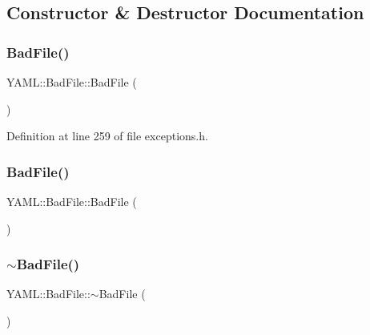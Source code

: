 \subsection{Constructor \& Destructor Documentation}
\mbox{\label{class_y_a_m_l_1_1_bad_file_a3a1c7d671955a43693e4ed9b4f9966de}} 
\subsubsection{\texorpdfstring{BadFile()}{BadFile()}\hspace{0.1cm}{\footnotesize\ttfamily [1/2]}}
{\footnotesize\ttfamily Y\+A\+M\+L\+::\+Bad\+File\+::\+Bad\+File (\begin{DoxyParamCaption}{ }\end{DoxyParamCaption})\hspace{0.3cm}{\ttfamily [inline]}}



Definition at line 259 of file exceptions.\+h.

\mbox{\label{class_y_a_m_l_1_1_bad_file_a7fa6e06c3fe955f7bff500d9cf553f6d}} 
\subsubsection{\texorpdfstring{BadFile()}{BadFile()}\hspace{0.1cm}{\footnotesize\ttfamily [2/2]}}
{\footnotesize\ttfamily Y\+A\+M\+L\+::\+Bad\+File\+::\+Bad\+File (\begin{DoxyParamCaption}\item[{const \mbox{\hyperlink{class_y_a_m_l_1_1_bad_file}{Bad\+File}} \&}]{ }\end{DoxyParamCaption})\hspace{0.3cm}{\ttfamily [default]}}

\mbox{\label{class_y_a_m_l_1_1_bad_file_a954c85cdaba3c4c111abdf0b74a47fff}} 
\subsubsection{\texorpdfstring{$\sim$BadFile()}{~BadFile()}}
{\footnotesize\ttfamily Y\+A\+M\+L\+::\+Bad\+File\+::$\sim$\+Bad\+File (\begin{DoxyParamCaption}{ }\end{DoxyParamCaption})\hspace{0.3cm}{\ttfamily [virtual]}}



